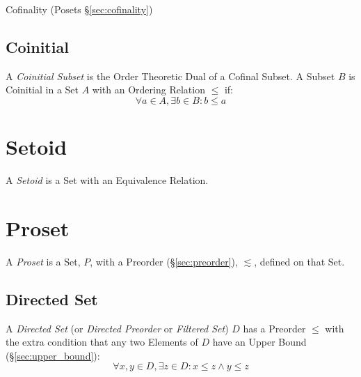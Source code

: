 Cofinality (Posets \S\ref{sec:cofinality})



\subsection{Coinitial}\label{sec:coinitial_subset}

A \emph{Coinitial Subset} is the Order Theoretic Dual of a Cofinal
Subset. A Subset $B$ is Coinitial in a Set $A$ with an Ordering
Relation $\leq$ if:
\[
  \forall a \in A, \exists b \in B : b \leq a
\]



\section{Setoid}\label{sec:setoid}

A \emph{Setoid} is a Set with an Equivalence Relation.



\section{Proset}\label{sec:proset}

A \emph{Proset} is a Set, $P$, with a Preorder
(\S\ref{sec:preorder}), $\lesssim$, defined on that Set.



\subsection{Directed Set}\label{sec:directed_set}

A \emph{Directed Set} (or \emph{Directed Preorder} or \emph{Filtered
  Set}) $D$ has a Preorder $\leq$ with the extra condition that any
two Elements of $D$ have an Upper Bound (\S\ref{sec:upper_bound}):
\[
  \forall x, y \in D, \exists z \in D : x \leq z \wedge y \leq z
\]



